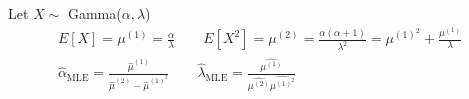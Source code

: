 \begin{example-N}
	Let $X \sim $ Gamma($\alpha, \lambda$)
	\begin{gather*}
		E[X] = \mu^{(1)}= \frac{\alpha}{\lambda} \qquad E[X^2] = 
		\mu^{(2)} = \frac{\alpha(\alpha + 1)}{\lambda^2} = \mu^{(1)^2} + \frac{\mu^{(1)}}{\lambda}\\
		\hat{\alpha}_{\text{MLE}} = \frac{\hat{\mu}^{(1)}}{\hat{\mu}^{(2)} - \hat{\mu}^{(1)^2}} \qquad \hat{\lambda}_{\text{MLE}} = \frac{\hat{\mu^{(1)}}}{\hat{\mu^{(2)}} \hat{\mu^{(1)^2}}}
	\end{gather*}
\end{example-N}